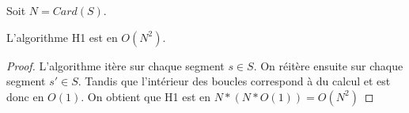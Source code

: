 Soit $N = Card(S)$.
\begin{prop}
  L'algorithme H1 est en $O(N^2)$.
\end{prop}
\begin{proof}
  L'algorithme itère sur chaque segment $s \in S$.
  On réitère ensuite sur chaque segment $s' \in S$.
  Tandis que l'intérieur des boucles correspond à du calcul et
  est donc en $O(1)$.  On obtient que H1 est en $N*(N*O(1)) = O(N^2)$
\end{proof}



